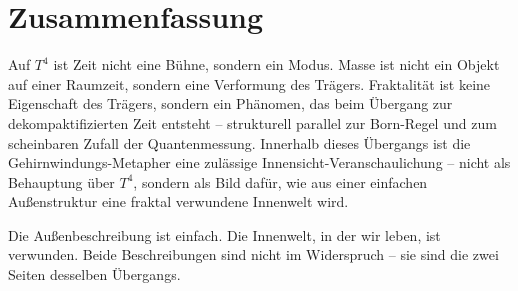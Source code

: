 \section{Zusammenfassung}

Auf $T^4$ ist Zeit nicht eine Bühne, sondern ein Modus. Masse ist
nicht ein Objekt auf einer Raumzeit, sondern eine Verformung des
Trägers. Fraktalität ist keine Eigenschaft des Trägers, sondern ein
Phänomen, das beim Übergang zur dekompaktifizierten Zeit entsteht --
strukturell parallel zur Born-Regel und zum scheinbaren Zufall der
Quantenmessung. Innerhalb dieses Übergangs ist die Gehirnwindungs-Metapher
eine zulässige Innensicht-Veranschaulichung -- nicht als Behauptung
über $T^4$, sondern als Bild dafür, wie aus einer einfachen
Außenstruktur eine fraktal verwundene Innenwelt wird.

Die Außenbeschreibung ist einfach. Die Innenwelt, in der wir leben,
ist verwunden. Beide Beschreibungen sind nicht im Widerspruch -- sie
sind die zwei Seiten desselben Übergangs.

